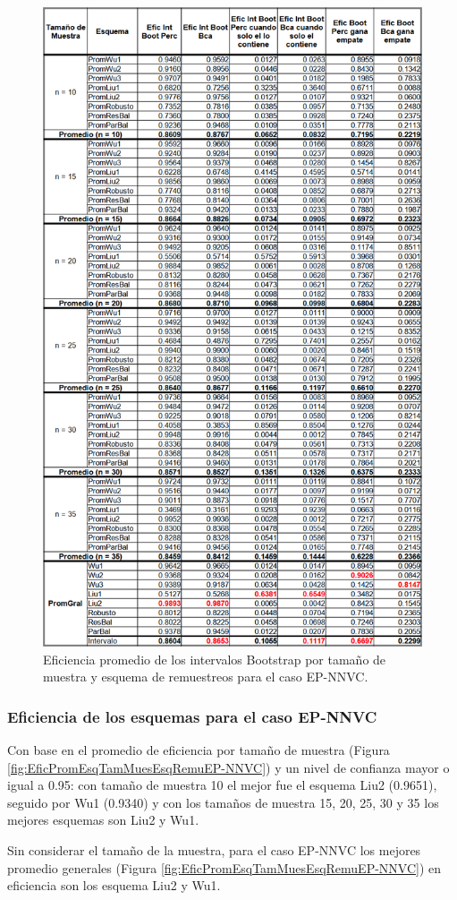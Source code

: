 \begin{figure}[ht] 
	\centering 
	\includegraphics[width=0.55\linewidth]{img/EP_NNVC_Efic_Boots.png} 
	\caption{Eficiencia promedio de los intervalos Bootstrap por tamaño de muestra y esquema de remuestreos para el caso EP-NNVC.} 
	\label{fig:EficPromIntBootsTamMuestEsqRemuEP-NNVC}
\end{figure}
\FloatBarrier


\subsubsection{Eficiencia de los esquemas para el caso EP-NNVC}
Con base en el promedio de eficiencia por tamaño de muestra (Figura \ref{fig:EficPromEsqTamMuesEsqRemuEP-NNVC}) y un nivel de confianza mayor o igual a 0.95: con tamaño de muestra 10 el mejor fue el esquema Liu2 (0.9651), seguido por Wu1 (0.9340) y con los tamaños de muestra 15, 20, 25, 30 y 35 los mejores esquemas son Liu2 y Wu1.
\vspace{.5cm}


Sin considerar el tamaño de la muestra, para el caso EP-NNVC los mejores promedio generales (Figura \ref{fig:EficPromEsqTamMuesEsqRemuEP-NNVC}) en eficiencia son los esquema Liu2 y Wu1.


